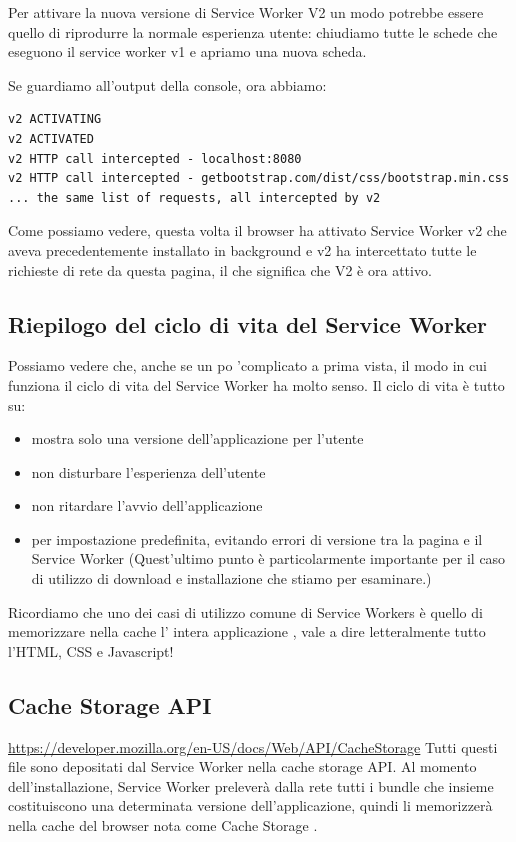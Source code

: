 \documentclass[italian]{article}
\begin{document}
Per attivare la nuova versione di Service Worker V2 un modo potrebbe essere quello di riprodurre la normale esperienza utente: chiudiamo tutte le schede che eseguono il service worker v1 e apriamo una nuova scheda.

Se guardiamo all'output della console, ora abbiamo:
\begin{lstlisting}
v2 ACTIVATING
v2 ACTIVATED
v2 HTTP call intercepted - localhost:8080
v2 HTTP call intercepted - getbootstrap.com/dist/css/bootstrap.min.css
... the same list of requests, all intercepted by v2
\end{lstlisting}
Come possiamo vedere, questa volta il browser ha attivato Service Worker v2 che aveva precedentemente installato in background e v2 ha intercettato tutte le richieste di rete da questa pagina, il che significa che V2 è ora attivo.
\\
\subsection{Riepilogo del ciclo di vita del Service Worker}
Possiamo vedere che, anche se un po 'complicato a prima vista, il modo in cui funziona il ciclo di vita del Service Worker ha molto senso. Il ciclo di vita è tutto su:
\begin{itemize}
\item mostra solo una versione dell'applicazione per l'utente
\item non disturbare l'esperienza dell'utente
\item non ritardare l'avvio dell'applicazione
\item per impostazione predefinita, evitando errori di versione tra la pagina e il Service Worker (Quest'ultimo punto è particolarmente importante per il caso di utilizzo di download e installazione che stiamo per esaminare.)
\end{itemize}

Ricordiamo che uno dei casi di utilizzo comune di Service Workers è quello di memorizzare nella cache l' intera applicazione , vale a dire letteralmente tutto l'HTML, CSS e Javascript!

\subsection{Cache Storage API}
\url{https://developer.mozilla.org/en-US/docs/Web/API/CacheStorage}
Tutti questi file sono depositati dal Service Worker nella cache storage API.
Al momento dell'installazione, Service Worker preleverà dalla rete tutti i bundle che insieme costituiscono una determinata versione dell'applicazione, quindi li memorizzerà nella cache del browser nota come Cache Storage .
\end{document}
